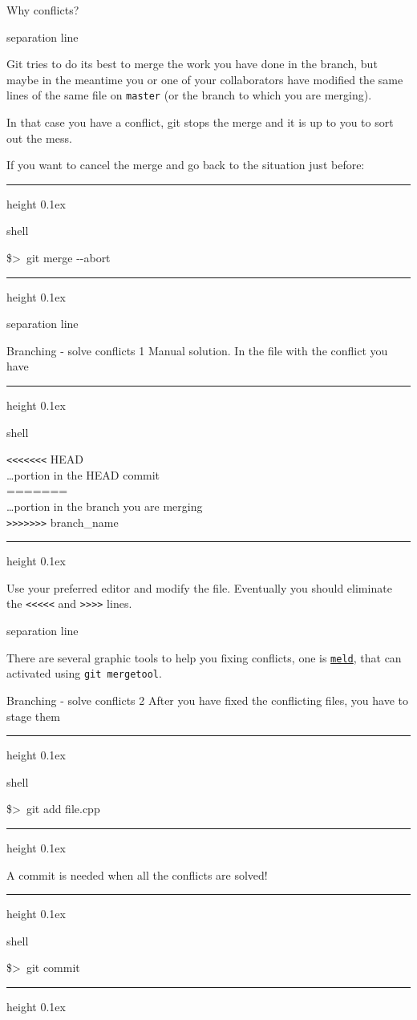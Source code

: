 \documentclass[hyperref={colorlinks}]{beamer}
\newenvironment{shell}{%
\footnotesize\flushleft\hrule height 0.1ex
\tt\begin{beamercolorbox}[sep=1ex,left]{shell}%
}{%
\end{beamercolorbox}
\hrule height 0.1ex
\endflushleft\par
}
\newcommand*{\psone}[1][ant]{\$>~}
\newcommand{\titleline}[1][0.025cm]{%
\begin{beamercolorbox}[wd=\paperwidth,ht=#1,center]{separation line}%
\end{beamercolorbox}%
}
\begin{document}
\begin{frame}{Why conflicts?}
  \titleline
  Git tries to do its best to merge the work you have done in the branch, but maybe in the meantime you or one of your collaborators have modified the same lines of the same file on \texttt{master} (or the branch to which you are merging).
\medskip

In that case you have a \alert{conflict}, git stops the merge and it is up to you to sort out the mess.
\smallskip

If you want to cancel the merge and go back to the situation just before:
\begin{shell}
\psone git merge -{}-abort
\end{shell}
\titleline

\end{frame}
\begin{frame}[fragile]{Branching  - solve conflicts 1}
Manual solution. In the file with the conflict you have
\begin{shell}
\verb!<<<<<<<! HEAD\\
\ldots portion in the HEAD commit\\
=======\\
\ldots portion in the branch you are merging\\
\verb!>>>>>>>! branch_name\\
\end{shell}
Use your preferred editor and modify the file. Eventually you should eliminate the \verb!<<<<<! and \verb!>>>>! lines.
\titleline

There are several graphic tools to help you fixing conflicts, one is \href{http://meldmerge.org/}{\texttt{meld}}, that can activated using
\texttt{git mergetool}.
\end{frame}

\begin{frame}[fragile]{Branching  - solve conflicts 2}
After you have fixed the conflicting files, you have to stage them
\begin{shell}
\psone git add file.cpp
\end{shell}
A commit is needed when all the conflicts are solved!
\begin{shell}
\psone git commit
\end{shell}
\end{frame}
%
\end{document}
